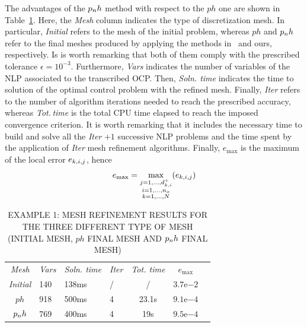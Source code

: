 The advantages of the $p_{n}h$ method with respect to the $ph$ one are shown in Table~\ref{tab:tablevanderpol}. Here, the \emph{Mesh} column indicates the type of discretization mesh. In particular, \emph{Initial} refers to the mesh of the initial problem, whereas $ph$ and $p_{n}h$ refer to the final meshes produced by applying the methods in~\cite{Patterson:OCAM:2015} and ours, respectively. Is is worth remarking that both of them comply with the prescribed tolerance $\epsilon=10^{-3}$. Furthermore, \emph{Vars} indicates the number of variables of the NLP associated to the transcribed OCP. Then, \emph{Soln. time} indicates the time to solution of the optimal control problem with the refined mesh. Finally, \emph{Iter} refers to the number of algorithm iterations needed to reach the prescribed accuracy, whereas \emph{Tot.\,time} is the total CPU time elapsed to reach the imposed convergence criterion. It is worth remarking that it includes the necessary time to build and solve all the \emph{Iter} $+1$ successive NLP problems and the time spent by the application of \emph{Iter} mesh refinement algorithms. Finally, $e_\text{max}$  is the maximum of the local error $e_{k,i,j}$, hence
\begin{equation}
e_\text{max}= \max\limits_{\substack{j = 1, \dots, d_{k,i}^{+} \\ i = 1, \dots, n_x \\ k = 1, \dots, N}} (e_{k,i,j})
\end{equation}
\begin{table}[t]
	\caption{EXAMPLE 1: MESH REFINEMENT RESULTS FOR THE THREE DIFFERENT TYPE OF MESH (INITIAL MESH, $ph$ FINAL MESH AND $p_{n}h$ FINAL MESH)}
	\begin{center}
		\label{tab:tablevanderpol}
		\begin{tabular}{c l l l c c c}
			& & \\ %
			\hline
			\emph{Mesh} & \emph{Vars} & \emph{Soln. time} & \emph{Iter} & \emph{Tot. time} & $e_\text{max}$ \\
			\hline
			\emph{Initial} & 140 & 138ms & / & / &  $3.7\mathrm{e}{-2}$\\
			$ph$ & 918 & 500ms & 4 & 23.1s & $9.1\mathrm{e}{-4}$ \\
			$p_{n}h$ & 769 & 400ms & 4 & 19s & $9.5\mathrm{e}{-4}$ \\
			\hline
		\end{tabular}
	\end{center}
\end{table}
